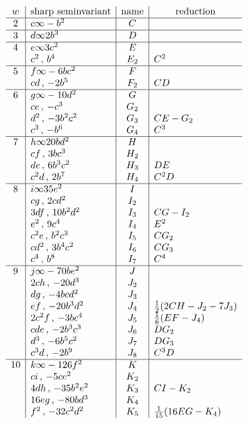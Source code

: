 \documentclass[11pt]{article}
\begin{document}
\begingroup
\scriptsize
\setlength{\arraycolsep}{2.5pt}
\[
\begin{array}{c|l|c|l}
w & \multicolumn{1}{c|}{\hbox{sharp seminvariant}} &
\hbox{name} & \multicolumn{1}{c}{\hbox{reduction}}\\ \hline
2& c\infty -b^2&C&\\ \hline
3& d\infty 2b^3&D&\\ \hline
4& e\infty 3c^2&E&\\
 & c^2\,,\, b^4&E_2& C^2\\ \hline
5& f\infty -6bc^2&F&\\
 & cd\,,\, -2b^5&F_2&CD\\ \hline
6& g\infty -10d^2&G&\\
 & ce\,,\, -c^3&G_2&\\
 & d^2\,,\, -3b^2c^2&G_3&CE-G_2\\
 & c^3\,,\, -b^6&G_4&C^3\\ \hline
7& h\infty 20bd^2&H&\\
 & cf\,,\, 3bc^3&H_2&\\
 & de\,,\, 6b^3c^2&H_3&DE\\
 & c^2d\,,\, 2b^7&H_4&C^2D\\ \hline
8& i\infty 35e^2&I&\\
 & cg\,,\, 2cd^2&I_2&\\
 & 3df\,,\, 10b^2d^2&I_3&CG-I_2\\
 & e^2\,,\, 9c^4&I_4&E^2\\
 & c^2e\,,\, b^2c^3&I_5&CG_2\\
 & cd^2\,,\, 3b^4c^2&I_6&CG_3\\
 & c^4\,,\, b^8&I_7&C^4\\ \hline
9& j\infty -70be^2&J&\\
 & 2ch\,,\, -20d^3&J_2&\\
 & dg\,,\, -4bcd^2&J_3&\\
 & ef\,,\, -20b^3d^2&J_4&\frac12(2CH-J_2-7J_3)\\
 & 2c^2f\,,\, -3bc^4&J_5&\frac16(EF-J_4)\\
 & cde\,,\, -2b^3c^3&J_6&DG_2\\
 & d^3\,,\, -6b^5c^2&J_7&DG_3\\
 & c^3d\,,\, -2b^9&J_8&C^3D\\ \hline
10& k\infty -126f^2&K&\\
 & ci\,,\, -5ce^2&K_2&\\
 & 4dh\,,\, -35b^2e^2&K_3&CI-K_2\\
 & 16eg\,,\, -80bd^3&K_4&\\
 & f^2\,,\, -32c^2d^2&K_5&\frac1{15}(16EG-K_4)\\

\end{array}\]
\end{document}
